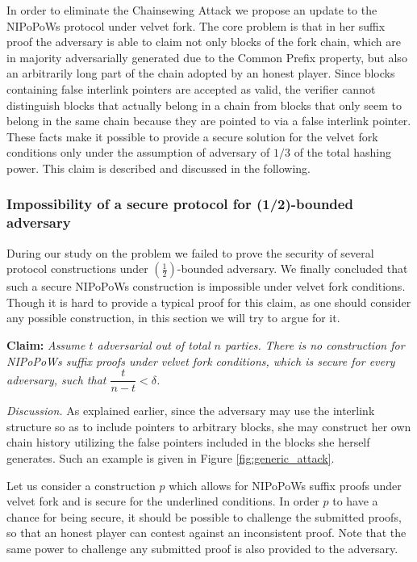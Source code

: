In order to eliminate the Chainsewing Attack we propose an update to the NIPoPoWs protocol under velvet fork. The core problem is that in her suffix proof the adversary is able to claim not only blocks of the fork chain,  which are in majority adversarially generated due to the Common Prefix property, but also an arbitrarily long part of the chain adopted by an honest player. Since blocks containing false interlink pointers are accepted as valid, the verifier cannot distinguish blocks that actually belong in a chain from blocks that only seem to belong in the same chain because they are pointed to via a false interlink pointer. \\

These facts make it possible to provide a secure solution for the velvet fork conditions only under the assumption of adversary of $1/3$ of the total hashing power. This claim is described and discussed in the following.

\subsubsection*{Impossibility of a secure protocol for (1/2)-bounded adversary}
During our study on the problem we failed to prove the security of several protocol constructions under $(\frac{1}{2})$-bounded adversary. We finally concluded that such a secure NIPoPoWs construction is impossible under velvet fork conditions. Though it is hard to provide a typical proof for this claim, as one should consider any possible construction, in this section we will try to argue for it. 

\textbf{Claim:} \textit{Assume $t$ adversarial out of total $n$ parties. There is no construction for NIPoPoWs suffix proofs under velvet fork conditions, which is secure for every adversary, such that $\dfrac{t}{n-t} < \delta$.}

\textit{Discussion.} As explained earlier, since the adversary may use the interlink structure so as to include pointers to arbitrary blocks,  she may construct her own chain history utilizing the false pointers included in the blocks she herself generates. Such an example is given in Figure \ref{fig:generic_attack}.

Let us consider a construction $p$ which allows for NIPoPoWs suffix proofs under velvet fork and is secure for the underlined conditions. In order $p$ to have a chance for being secure, it should be possible to challenge the submitted proofs, so that an honest player can contest against an inconsistent proof. Note that the same power to challenge any submitted proof is also provided to the adversary.



